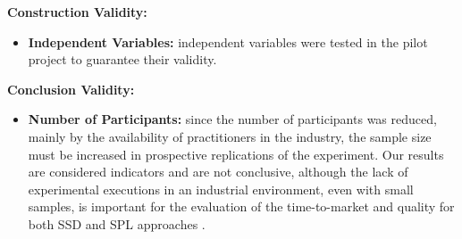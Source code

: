 \vspace{1em}
\textbf{Construction Validity:} 

\begin{itemize}

\item \textbf{Independent Variables:} independent variables were tested in the pilot project to guarantee their validity.

\end{itemize}

\vspace{1em}
\textbf{Conclusion Validity:} 

\begin{itemize}

\item \textbf{Number of Participants:} since the number of participants was reduced, mainly by the availability of practitioners in the industry, the sample size must be increased in prospective replications of the experiment. Our results are considered indicators and are not conclusive, although the lack of experimental executions in an industrial environment, even with small samples, is important for the evaluation of the time-to-market and quality for both SSD and SPL approaches \cite{falessi2017,host2000}.

\end{itemize}
